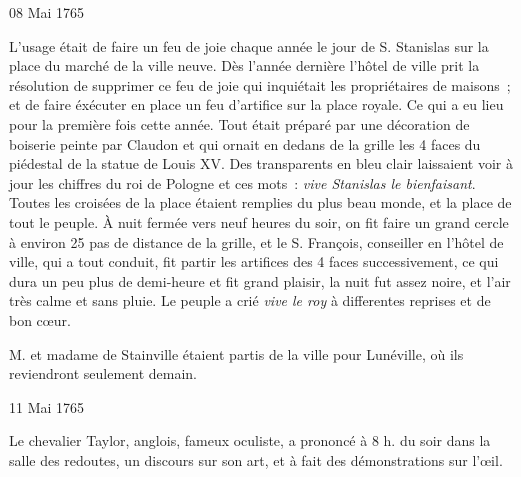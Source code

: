 \begin{diary}{08 Mai 1765}{}
        
                         L'usage était de faire un feu de joie chaque
                           année le jour de S. Stanislas sur la
                              place du
                              marché de la ville neuve. Dès l'année dernière
                           l'hôtel de ville prit la résolution
                           de supprimer
                           ce feu de joie qui inquiétait les propriétaires
                           de maisons ; et de faire éxécuter en place
                           un feu d'artifice sur la place royale.
                           Ce qui a eu lieu pour la première fois cette
                           année. Tout était préparé par une
                           décoration de boiserie peinte par Claudon
                           et qui ornait en dedans de la grille les
                           4 faces du piédestal de la statue de Louis XV.
                           Des transparents en bleu clair laissaient
                           voir à jour les chiffres du roi
                              de Pologne
                           et ces mots : \emph{vive Stanislas le
                              bienfaisant}.
                           Toutes les croisées de la place étaient
                           remplies du plus beau monde, et la place
                           de tout le peuple. À nuit fermée vers
                           neuf heures du soir, on fit faire un grand
                           cercle à environ 25 pas de distance de la grille, et le S. François, conseiller en l'hôtel
                              de ville, qui a tout conduit, fit partir les
                           artifices des 4 faces successivement, ce qui
                           dura un peu plus de demi-heure et fit grand plaisir, la nuit fut assez noire,
                           et l'air très calme et sans
                           pluie. Le
                           peuple a crié \emph{vive le roy} à
                           differentes
                           reprises et de bon cœur. \bigskip
        
        
                        
                           M. et madame de Stainville étaient partis
                           de la ville pour Lunéville,
                           où ils
                           reviendront seulement demain. \bigskip
        
        
                     \end{diary}
                     \begin{diary}{11 Mai 1765}{}
                        
                        
                           Le chevalier Taylor, anglois, fameux
                           oculiste,
                           a prononcé à 8 h. du soir dans la salle des
                           redoutes, un discours sur son art, et à fait
                           des démonstrations sur l'œil. \bigskip
        
        
                     \end{diary}
